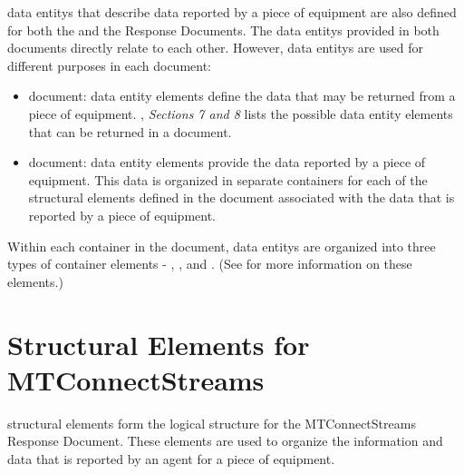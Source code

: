 \glspl{data entity} that describe data reported by a piece of equipment are also defined for both the  and the  \glspl{Response Document}.  The \glspl{data entity} provided in both documents directly relate to each other.  However, \glspl{data entity} are used for different purposes in each document:


\begin{itemize}
    \item {} document: \gls{data entity} elements define the data that may be returned from a piece of equipment.  , \textit{Sections 7 and 8} lists the possible \gls{data entity} elements that can be returned in a  document.  

    \item {} document: \gls{data entity} elements provide the data reported by a piece of equipment.  This data is organized in separate  containers for each of the \glspl{structural element} defined in the  document associated with the data that is reported by a piece of equipment.  


\end{itemize}

Within each  container in the  document, \glspl{data entity} are organized into three types of container elements - , , and .  (See  for more information on these elements.)

\section{Structural Elements for MTConnectStreams}
\label{sec:Structural Elements for MTConnectStreams}

\glspl{structural element} form the logical structure for the \gls{MTConnectStreams Response Document}.  These elements are used to organize the information and data that is reported by an \gls{agent} for a piece of equipment.


